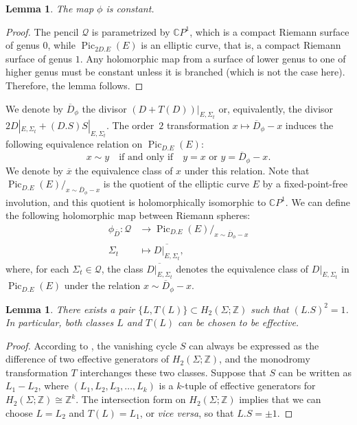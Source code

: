 \documentclass[11pt]{amsart}
\numberwithin{equation}{section}
\theoremstyle{definition}
\theoremstyle{plain}
\newtheorem{lemma}[definition]{Lemma}
\theoremstyle{remark}
\newcommand{\Z}{\mathbb{Z}}
\newcommand{\C}{\mathbb{C}}
\DeclareMathOperator{\Pic}{Pic}
\begin{document}
\begin{lemma} \label{lem-constant.map}
The map $\phi$ is constant.
\end{lemma} 

\begin{proof}
  The pencil $\mathcal{Q}$ is parametrized by $\mathbb{C}P^1$, which is a compact Riemann surface of genus $0$, while $\Pic_{2D.E}(E)$ is an elliptic curve, that is, a compact Riemann surface of genus $1$. 
Any holomorphic map from a surface of lower genus to one of higher genus must be constant unless it is branched (which is not the case here). Therefore, the lemma follows. 
\end{proof}
  
We denote by $\overline{D}_{\phi}$ the divisor $(D+T(D))|_{E,\Sigma_t}$ or, equivalently, the divisor  $2D|_{E,\Sigma_t}+(D.S) S|_{E,\Sigma_t}$. The order~$2$ transformation $x \mapsto \overline{D}_{\phi} - x$ induces the following equivalence  relation on $\Pic_{D.E} (E)$:
$$x \sim y \quad \text{if and only if}\quad y=x \text{ or } y=\overline{D}_{\phi}-x.$$
We denote by $\overline{x}$ the equivalence class of $x$ under this relation.
Note that $\Pic_{D.E} (E)/_{x \sim \overline{D}_{\phi}-x}$ is the quotient of the elliptic curve $E$ by a fixed-point-free involution, and this quotient is holomorphically  
isomorphic to $\C {P}^1$.
We can define the following 
holomorphic map between Riemann spheres:
    \begin{align*}
    \phi_{\overline{D}}\colon  \mathcal{Q} &\longrightarrow \Pic_{D.E} (E)/_{x \sim \overline{D}_{\phi}-x}\\
    \Sigma_t &\longmapsto \overline{D|_{E,\Sigma_t}}, 
\end{align*}
where, for each $\Sigma_t \in \mathcal{Q}$, the class $\overline{D|_{E, \Sigma_t}}$ denotes the equivalence class of $D|_{E, \Sigma_t}$ in $\Pic_{D.E}(E)$ under the relation $x \sim \overline{D}_{\phi} - x$.

\begin{lemma} \label{lem-existence.of.L}
There exists a pair $\{L,T(L)\}\subset H_2(\Sigma;\Z)$ such that $(L.S)^2=1$. In particular, both classes $L$ and  $T(L)$ can be chosen to be effective. 
\end{lemma} 

\begin{proof}
According to \cite[Claim (6), p.~26]{demazure2006seminaire}, the vanishing cycle $S$ can always be expressed as the difference of two effective generators of $H_2(\Sigma; \mathbb{Z})$, and the monodromy transformation $T$ interchanges these two classes. Suppose that $S$ can be written as $L_1-L_2$, where $(L_1,L_2,L_3,\ldots, L_k)$ is a $k$-tuple of effective generators for $H_2(\Sigma;\Z)\cong \Z^k$. The intersection form on $H_2(\Sigma;\Z)$ implies that we can choose $L=L_2$ and $T(L)=L_1$, or \textit{vice versa}, so that $L.S = \pm 1$.  
\end{proof}
\end{document}
